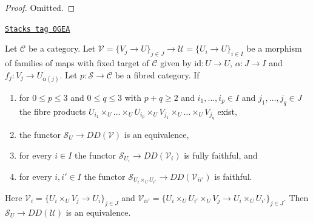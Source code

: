 \begin{proof}
Omitted.
\end{proof}

\begin{lemma}
\label{stacks-lemma-compare-descent-condition}
\href{https://stacks.math.columbia.edu/tag/0GEA}{\texttt{Stacks tag 0GEA}}

Let $\mathcal{C}$ be a category. Let
$\mathcal{V} = \{V_j \to U\}_{j \in J} \to
\mathcal{U} = \{U_i \to U\}_{i \in I}$
be a morphism of families of maps with fixed target of
$\mathcal{C}$ given by $\text{id} : U \to U$,
$\alpha : J \to I$ and $f_j : V_j \to U_{\alpha(j)}$. Let
$p : \mathcal{S} \to \mathcal{C}$ be a fibred category. If
\begin{enumerate}
\item for $0 \leq p \leq 3$ and $0 \leq q \leq 3$ with $p + q \geq 2$
and $i_1, \ldots, i_p \in I$ and $j_1, \ldots, j_q \in J$
the fibre products $U_{i_1} \times_U \ldots \times_U U_{i_p} \times_U
V_{j_1} \times_U \ldots \times_U V_{j_q}$ exist,
\item the functor $\mathcal{S}_U \to DD(\mathcal{V})$
is an equivalence,
\item for every $i \in I$ the functor
$\mathcal{S}_{U_i} \to DD(\mathcal{V}_i)$
is fully faithful, and
\item for every $i, i' \in I$ the functor
$\mathcal{S}_{U_i \times_U U_{i'}} \to DD(\mathcal{V}_{ii'})$
is faithful.
\end{enumerate}
Here $\mathcal{V}_i = \{U_i \times_U V_j \to U_i\}_{j \in J}$ and
$\mathcal{V}_{ii'} =
\{U_i \times_U U_{i'} \times_U V_j \to U_i \times_U U_{i'}\}_{j \in J}$.
Then $\mathcal{S}_U \to DD(\mathcal{U})$ is an equivalence.
\end{lemma}

